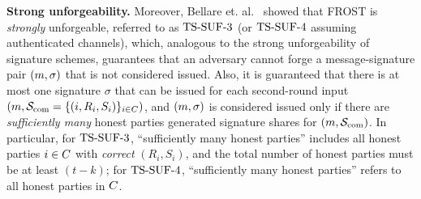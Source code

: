 \medskip
\textbf{Strong unforgeability.} Moreover, Bellare et. al.~\cite{BellareCKMTZ22} showed that FROST is \emph{strongly} unforgeable, referred to as $\mathrm{TS}\mbox{-}\mathrm{SUF}\mbox{-}{3}$ (or $\mathrm{TS}\mbox{-}\mathrm{SUF}\mbox{-}{4}$ assuming authenticated channels), which, analogous to the strong unforgeability of signature schemes, guarantees that an adversary cannot forge a message-signature pair $(m,\sigma)$ that is not considered issued.
Also, it is guaranteed that there is at most one signature $\sigma$ that can be issued for each second-round input $(m, \mathcal{S}_{\rm com}=\{ (i, R_{i}, S_{i})\}_{i \in C})$, and $(m, \sigma)$ is considered issued only if there are \emph{sufficiently many} honest parties generated signature shares for $(m, \mathcal{S}_{\rm com})$.
In particular, for $\mathrm{TS}\mbox{-}\mathrm{SUF}\mbox{-}{3}$, ``sufficiently many honest parties'' includes all honest parties $i\in C$ with \emph{correct} $(R_{i}, S_{i})$, and the total number of honest parties must be at least $(t - k)$; for $\mathrm{TS}\mbox{-}\mathrm{SUF}\mbox{-}{4}$, ``sufficiently many honest parties'' refers to all honest parties in $C$.




